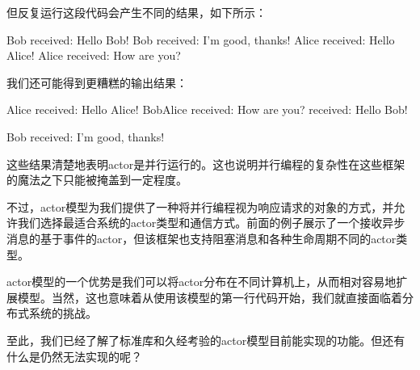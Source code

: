 但反复运行这段代码会产生不同的结果，如下所示：

\begin{shell}
Bob received: Hello Bob!
Bob received: I'm good, thanks!
Alice received: Hello Alice!
Alice received: How are you?
\end{shell}

我们还可能得到更糟糕的输出结果：

\begin{shell}
Alice received: Hello Alice!
BobAlice received: How are you? received: Hello Bob!

Bob received: I'm good, thanks!
\end{shell}

这些结果清楚地表明actor是并行运行的。这也说明并行编程的复杂性在这些框架的魔法之下只能被掩盖到一定程度。

不过，actor模型为我们提供了一种将并行编程视为响应请求的对象的方式，并允许我们选择最适合系统的actor类型和通信方式。前面的例子展示了一个接收异步消息的基于事件的actor，但该框架也支持阻塞消息和各种生命周期不同的actor类型。

actor模型的一个优势是我们可以将actor分布在不同计算机上，从而相对容易地扩展模型。当然，这也意味着从使用该模型的第一行代码开始，我们就直接面临着分布式系统的挑战。

至此，我们已经了解了标准库和久经考验的actor模型目前能实现的功能。但还有什么是仍然无法实现的呢？